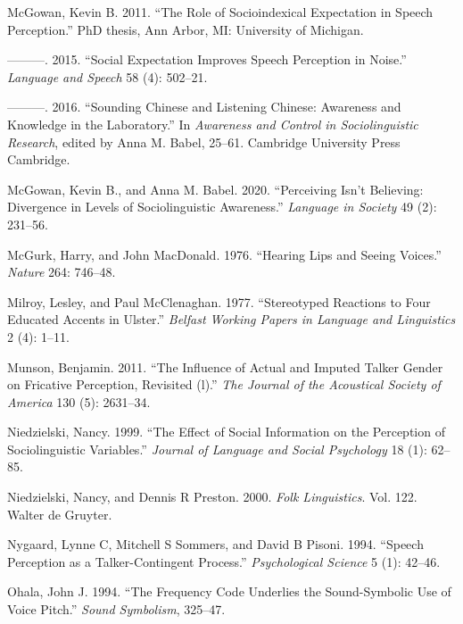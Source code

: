 \documentclass[
  letterpaper,
  DIV=11,
  numbers=noendperiod]{scrartcl}
\newlength{\cslhangindent}
\newenvironment{CSLReferences}[2] %
 {\begin{list}{}{%
  \setlength{\itemindent}{0pt}
  \setlength{\leftmargin}{0pt}
  \setlength{\parsep}{0pt}
  \ifodd #1
   \setlength{\leftmargin}{\cslhangindent}
   \setlength{\itemindent}{-1\cslhangindent}
  \fi
  \setlength{\itemsep}{#2\baselineskip}}}
 {\end{list}}
\begin{document}
\begin{CSLReferences}{1}{0}
McGowan, Kevin B. 2011. {``The Role of Socioindexical Expectation in
Speech Perception.''} PhD thesis, Ann Arbor, MI: University of Michigan.

---------. 2015. {``Social Expectation Improves Speech Perception in
Noise.''} \emph{Language and Speech} 58 (4): 502--21.

---------. 2016. {``Sounding Chinese and Listening Chinese: Awareness
and Knowledge in the Laboratory.''} In \emph{Awareness and Control in
Sociolinguistic Research}, edited by Anna M. Babel, 25--61. Cambridge
University Press Cambridge.

McGowan, Kevin B., and Anna M. Babel. 2020. {``Perceiving Isn't
Believing: Divergence in Levels of Sociolinguistic Awareness.''}
\emph{Language in Society} 49 (2): 231--56.

McGurk, Harry, and John MacDonald. 1976. {``Hearing Lips and Seeing
Voices.''} \emph{Nature} 264: 746--48.

Milroy, Lesley, and Paul McClenaghan. 1977. {``Stereotyped Reactions to
Four Educated Accents in Ulster.''} \emph{Belfast Working Papers in
Language and Linguistics} 2 (4): 1--11.

Munson, Benjamin. 2011. {``The Influence of Actual and Imputed Talker
Gender on Fricative Perception, Revisited (l).''} \emph{The Journal of
the Acoustical Society of America} 130 (5): 2631--34.

Niedzielski, Nancy. 1999. {``The Effect of Social Information on the
Perception of Sociolinguistic Variables.''} \emph{Journal of Language
and Social Psychology} 18 (1): 62--85.

Niedzielski, Nancy, and Dennis R Preston. 2000. \emph{Folk Linguistics}.
Vol. 122. Walter de Gruyter.

Nygaard, Lynne C, Mitchell S Sommers, and David B Pisoni. 1994.
{``Speech Perception as a Talker-Contingent Process.''}
\emph{Psychological Science} 5 (1): 42--46.

Ohala, John J. 1994. {``The Frequency Code Underlies the Sound-Symbolic
Use of Voice Pitch.''} \emph{Sound Symbolism}, 325--47.


\end{CSLReferences}
\end{document}
